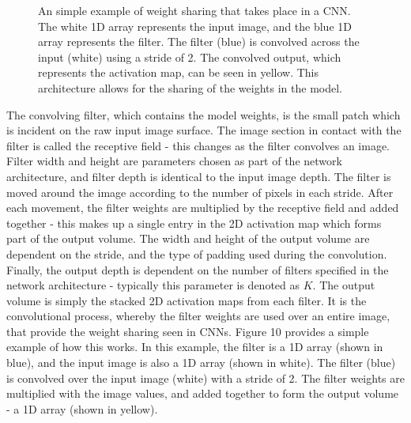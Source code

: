 \documentclass[a4paper]{article}
\begin{document}
\begin{figure}[h]
\begin{minipage}{0.45\textwidth}
\caption{An simple example of weight sharing that takes place in a CNN. The white 1D array represents the input image, and the blue 1D array represents the filter. The filter (blue) is convolved across the input (white) using a stride of 2. The convolved output, which represents the activation map, can be seen in yellow. This architecture allows for the sharing of the weights in the model.}
\end{minipage}
\end{figure}

The convolving filter, which contains the model weights, is the small patch which is incident on the raw input image surface. The image section in contact with the filter is called the receptive field - this changes as the filter convolves an image. Filter width and height are parameters chosen as part of the network architecture, and filter depth is identical to the input image depth. The filter is moved around the image according to the number of pixels in each stride. After each movement, the filter weights are multiplied by the receptive field and added together - this makes up a single entry in the 2D activation map which forms part of the output volume. The width and height of the output volume are dependent on the stride, and the type of padding used during the convolution. Finally, the output depth is dependent on the number of filters specified in the network architecture - typically this parameter is denoted as $K$. The output volume is simply the stacked 2D activation maps from each filter. It is the convolutional process, whereby the filter weights are used over an entire image, that provide the weight sharing seen in CNNs. Figure 10 provides a simple example of how this works. In this example, the filter is a 1D array (shown in blue), and the input image is also a 1D array (shown in white). The filter (blue) is convolved over the input image (white) with a stride of 2. The filter weights are multiplied with the image values, and added together to form the output volume - a 1D array (shown in yellow).\\
\end{document}
